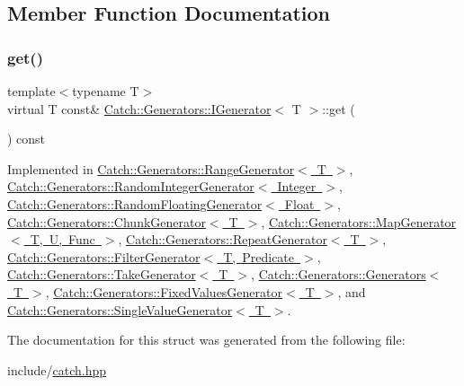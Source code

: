 \subsection{Member Function Documentation}
\mbox{\label{struct_catch_1_1_generators_1_1_i_generator_a525d381fc9249a885b075a0632a8579a}} 
\subsubsection{\texorpdfstring{get()}{get()}}
{\footnotesize\ttfamily template$<$typename T$>$ \\
virtual T const\& \mbox{\hyperlink{struct_catch_1_1_generators_1_1_i_generator}{Catch\+::\+Generators\+::\+I\+Generator}}$<$ T $>$\+::get (\begin{DoxyParamCaption}{ }\end{DoxyParamCaption}) const\hspace{0.3cm}{\ttfamily [pure virtual]}}



Implemented in \mbox{\hyperlink{class_catch_1_1_generators_1_1_range_generator_a2639173bb9f06ba353314cd226fcefec}{Catch\+::\+Generators\+::\+Range\+Generator$<$ T $>$}}, \mbox{\hyperlink{class_catch_1_1_generators_1_1_random_integer_generator_aafbdf9028762f5e8f8ca9c317d686fca}{Catch\+::\+Generators\+::\+Random\+Integer\+Generator$<$ Integer $>$}}, \mbox{\hyperlink{class_catch_1_1_generators_1_1_random_floating_generator_a0dea6fa1f9e2647df022f0b588cf0a8f}{Catch\+::\+Generators\+::\+Random\+Floating\+Generator$<$ Float $>$}}, \mbox{\hyperlink{class_catch_1_1_generators_1_1_chunk_generator_aa41c7d08a165b6a18560f2ab9e977f0b}{Catch\+::\+Generators\+::\+Chunk\+Generator$<$ T $>$}}, \mbox{\hyperlink{class_catch_1_1_generators_1_1_map_generator_a199d377afba00519f202c59b4b488235}{Catch\+::\+Generators\+::\+Map\+Generator$<$ T, U, Func $>$}}, \mbox{\hyperlink{class_catch_1_1_generators_1_1_repeat_generator_a43bd573274c9a0cd7f4406a3d0d36d49}{Catch\+::\+Generators\+::\+Repeat\+Generator$<$ T $>$}}, \mbox{\hyperlink{class_catch_1_1_generators_1_1_filter_generator_ab30e81b61a77430661d40f814758f6fe}{Catch\+::\+Generators\+::\+Filter\+Generator$<$ T, Predicate $>$}}, \mbox{\hyperlink{class_catch_1_1_generators_1_1_take_generator_aa4d2560f2066ec2eb4a351d62c107c78}{Catch\+::\+Generators\+::\+Take\+Generator$<$ T $>$}}, \mbox{\hyperlink{class_catch_1_1_generators_1_1_generators_a66705482b7efa88cae6e6b7062d5de6a}{Catch\+::\+Generators\+::\+Generators$<$ T $>$}}, \mbox{\hyperlink{class_catch_1_1_generators_1_1_fixed_values_generator_ad2ea8c959c600386bcc4b2656b40d33e}{Catch\+::\+Generators\+::\+Fixed\+Values\+Generator$<$ T $>$}}, and \mbox{\hyperlink{class_catch_1_1_generators_1_1_single_value_generator_a5142058c52131a2471e7307972f99b50}{Catch\+::\+Generators\+::\+Single\+Value\+Generator$<$ T $>$}}.



The documentation for this struct was generated from the following file\+:\begin{DoxyCompactItemize}
\item 
include/\mbox{\hyperlink{catch_8hpp}{catch.\+hpp}}\end{DoxyCompactItemize}

